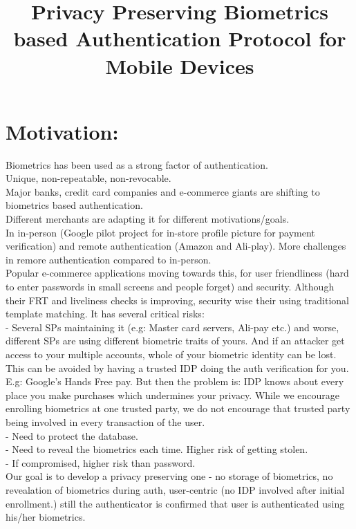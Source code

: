 \documentclass[11pt]{article}
\title{
Privacy Preserving Biometrics based Authentication Protocol for Mobile Devices}
\begin{document}
\maketitle
\section{Motivation:}
Biometrics has been used as a strong factor of authentication. \\
Unique, non-repeatable, non-revocable.\\
Major banks, credit card companies and e-commerce giants are shifting to biometrics based authentication.\\
Different merchants are adapting it for different motivations/goals.\\
In in-person (Google pilot project for in-store profile picture for payment verification) and remote authentication (Amazon and Ali-play). More 
challenges in remore authentication compared to in-person.\\
Popular e-commerce applications moving towards this, for user friendliness (hard to enter passwords in small screens and people forget) and security. 
Although their FRT and liveliness checks is improving, security wise their using traditional template matching. It has several critical risks:\\
- Several SPs maintaining it (e.g: Master card servers, Ali-pay etc.) and worse, different SPs are using different biometric traits of yours. And if 
an attacker get access to your multiple accounts, whole of your biometric identity can be lost.\\
This can be avoided by having a trusted IDP doing the auth verification for you. E.g: Google's Hands Free pay. But then the problem is: IDP knows 
about every place you make purchases which undermines your privacy. While we encourage enrolling biometrics at one trusted party, we do not 
encourage that trusted party being involved in every transaction of the user.\\
- Need to protect the database.\\
- Need to reveal the biometrics each time. Higher risk of getting stolen.\\
- If compromised, higher risk than password.\\
Our goal is to develop a privacy preserving one - no storage of biometrics, no revealation of biometrics during auth, user-centric (no IDP involved 
after initial enrollment.) still the authenticator is confirmed that user is authenticated using his/her biometrics.\\
\end{document}
